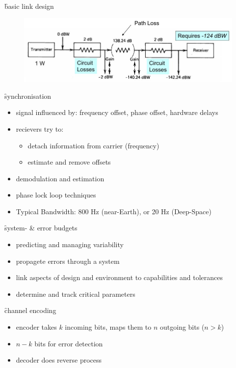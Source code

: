 \f{basic link design}
\begin{figure}[ht!]
 \centering
 \includegraphics[scale=0.6]{linkdesign}
\end{figure}

\f{synchronisation}
\begin{itemize}
 \item signal influenced by: frequency offset, phase offset, hardware delays
 \item recievers try to:
 \begin{itemize}
  \item detach information from carrier (frequency)
  \item estimate and remove offsets
 \end{itemize}
 \item demodulation and estimation
 \item phase lock loop techniques
 \item Typical Bandwidth: 800 Hz (near-Earth), or 20 Hz (Deep-Space)
\end{itemize}

\f{system- \& error budgets}
\begin{itemize}
 \item predicting and managing variability
 \item propagete errors through a system
 \item link aspects of design and environment to capabilities and tolerances
 \item determine and track critical parameters
\end{itemize}

\f{channel encoding}
\begin{itemize}
 \item encoder takes $k$ incoming bits, maps them to $n$ outgoing bits ($n> k$)
 \item $n-k$ bits for error detection
 \item decoder does reverse process
\end{itemize}